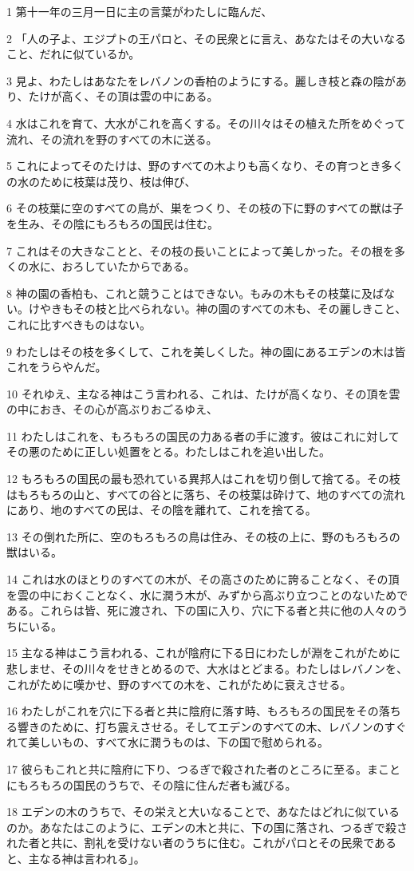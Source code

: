 \par 1 第十一年の三月一日に主の言葉がわたしに臨んだ、
\par 2 「人の子よ、エジプトの王パロと、その民衆とに言え、あなたはその大いなること、だれに似ているか。
\par 3 見よ、わたしはあなたをレバノンの香柏のようにする。麗しき枝と森の陰があり、たけが高く、その頂は雲の中にある。
\par 4 水はこれを育て、大水がこれを高くする。その川々はその植えた所をめぐって流れ、その流れを野のすべての木に送る。
\par 5 これによってそのたけは、野のすべての木よりも高くなり、その育つとき多くの水のために枝葉は茂り、枝は伸び、
\par 6 その枝葉に空のすべての鳥が、巣をつくり、その枝の下に野のすべての獣は子を生み、その陰にもろもろの国民は住む。
\par 7 これはその大きなことと、その枝の長いことによって美しかった。その根を多くの水に、おろしていたからである。
\par 8 神の園の香柏も、これと競うことはできない。もみの木もその枝葉に及ばない。けやきもその枝と比べられない。神の園のすべての木も、その麗しきこと、これに比すべきものはない。
\par 9 わたしはその枝を多くして、これを美しくした。神の園にあるエデンの木は皆これをうらやんだ。
\par 10 それゆえ、主なる神はこう言われる、これは、たけが高くなり、その頂を雲の中におき、その心が高ぶりおごるゆえ、
\par 11 わたしはこれを、もろもろの国民の力ある者の手に渡す。彼はこれに対してその悪のために正しい処置をとる。わたしはこれを追い出した。
\par 12 もろもろの国民の最も恐れている異邦人はこれを切り倒して捨てる。その枝はもろもろの山と、すべての谷とに落ち、その枝葉は砕けて、地のすべての流れにあり、地のすべての民は、その陰を離れて、これを捨てる。
\par 13 その倒れた所に、空のもろもろの鳥は住み、その枝の上に、野のもろもろの獣はいる。
\par 14 これは水のほとりのすべての木が、その高さのために誇ることなく、その頂を雲の中におくことなく、水に潤う木が、みずから高ぶり立つことのないためである。これらは皆、死に渡され、下の国に入り、穴に下る者と共に他の人々のうちにいる。
\par 15 主なる神はこう言われる、これが陰府に下る日にわたしが淵をこれがために悲しませ、その川々をせきとめるので、大水はとどまる。わたしはレバノンを、これがために嘆かせ、野のすべての木を、これがために衰えさせる。
\par 16 わたしがこれを穴に下る者と共に陰府に落す時、もろもろの国民をその落ちる響きのために、打ち震えさせる。そしてエデンのすべての木、レバノンのすぐれて美しいもの、すべて水に潤うものは、下の国で慰められる。
\par 17 彼らもこれと共に陰府に下り、つるぎで殺された者のところに至る。まことにもろもろの国民のうちで、その陰に住んだ者も滅びる。
\par 18 エデンの木のうちで、その栄えと大いなることで、あなたはどれに似ているのか。あなたはこのように、エデンの木と共に、下の国に落され、つるぎで殺された者と共に、割礼を受けない者のうちに住む。これがパロとその民衆であると、主なる神は言われる」。

